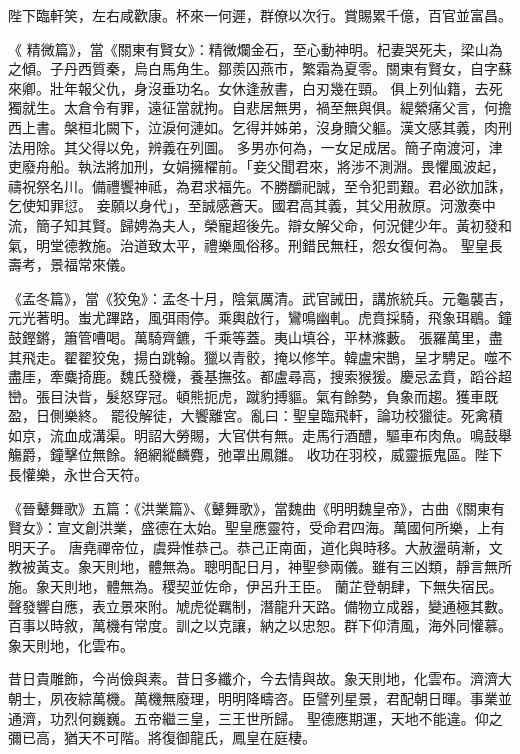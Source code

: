 \begin{pinyinscope}
 陛下臨軒笑，左右咸歡康。杯來一何遲，群僚以次行。賞賜累千億，百官並富昌。



 《
 精微篇》，當《關東有賢女》：精微爛金石，至心動神明。杞妻哭死夫，梁山為之傾。子丹西質秦，烏白馬角生。鄒羨囚燕市，繁霜為夏零。關東有賢女，自字蘇來卿。壯年報父仇，身沒垂功名。女休逢赦書，白刃幾在頸。
 俱上列仙籍，去死獨就生。太倉令有罪，遠征當就拘。自悲居無男，禍至無與俱。緹縈痛父言，何擔西上書。槃桓北闕下，泣淚何漣如。乞得并姊弟，沒身贖父軀。漢文感其義，肉刑法用除。其父得以免，辨義在列圖。
 多男亦何為，一女足成居。簡子南渡河，津吏廢舟船。執法將加刑，女娟擁櫂前。「妾父聞君來，將涉不測淵。畏懼風波起，禱祝祭名川。備禮饗神祗，為君求福先。不勝釂祀誠，至令犯罰艱。君必欲加誅，乞使知罪愆。
 妾願以身代」，至誠感蒼天。國君高其義，其父用赦原。河激奏中流，簡子知其賢。歸娉為夫人，榮寵超後先。辯女解父命，何況健少年。黃初發和氣，明堂德教施。治道致太平，禮樂風俗移。刑錯民無枉，怨女復何為。
 聖皇長壽考，景福常來儀。



 《孟冬篇》，當《狡兔》：孟冬十月，陰氣厲清。武官誡田，講旅統兵。元龜襲吉，元光著明。蚩尤蹕路，風弭雨停。乘輿啟行，鸞鳴幽軋。虎賁採騎，飛象珥鶡。鐘鼓鏗鏘，簫管嘈喝。萬騎齊鑣，千乘等蓋。夷山填谷，平林滌藪。
 張羅萬里，盡其飛走。翟翟狡兔，揚白跳翰。獵以青骹，掩以修竿。韓盧宋鵲，呈才騁足。噬不盡厓，牽麋掎鹿。魏氏發機，養基撫弦。都盧尋高，搜索猴猨。慶忌孟賁，蹈谷超巒。張目決眥，髮怒穿冠。頓熊扼虎，蹴豹搏貙。氣有餘勢，負象而趨。獲車既盈，日側樂終。
 罷役解徒，大饗離宮。亂曰：聖皇臨飛軒，論功校獵徒。死禽積如京，流血成溝渠。明詔大勞賜，大官供有無。走馬行酒醴，驅車布肉魚。鳴鼓舉觴爵，鐘擊位無餘。絕網縱麟麑，弛罩出鳳雛。
 收功在羽校，威靈振鬼區。陛下長懽樂，永世合天符。



 《晉鼙舞歌》五篇：《洪業篇》、《鼙舞歌》，當魏曲《明明魏皇帝》，古曲《關東有賢女》：宣文創洪業，盛德在太始。聖皇應靈符，受命君四海。萬國何所樂，上有明天子。
 唐堯禪帝位，虞舜惟恭己。恭己正南面，道化與時移。大赦盪萌漸，文教被黃支。象天則地，體無為。聰明配日月，神聖參兩儀。雖有三凶類，靜言無所施。象天則地，體無為。稷契並佐命，伊呂升王臣。
 蘭芷登朝肆，下無失宿民。聲發響自應，表立景來附。虓虎從羈制，潛龍升天路。備物立成器，變通極其數。百事以時敘，萬機有常度。訓之以克讓，納之以忠恕。群下仰清風，海外同懽慕。象天則地，化雲布。



 昔日貴雕飾，今尚儉與素。昔日多纖介，今去情與故。象天則地，化雲布。濟濟大朝士，夙夜綜萬機。萬機無廢理，明明降疇咨。臣譬列星景，君配朝日暉。事業並通濟，功烈何巍巍。五帝繼三皇，三王世所歸。
 聖德應期運，天地不能違。仰之彌已高，猶天不可階。將復御龍氏，鳳皇在庭棲。




\end{pinyinscope}
